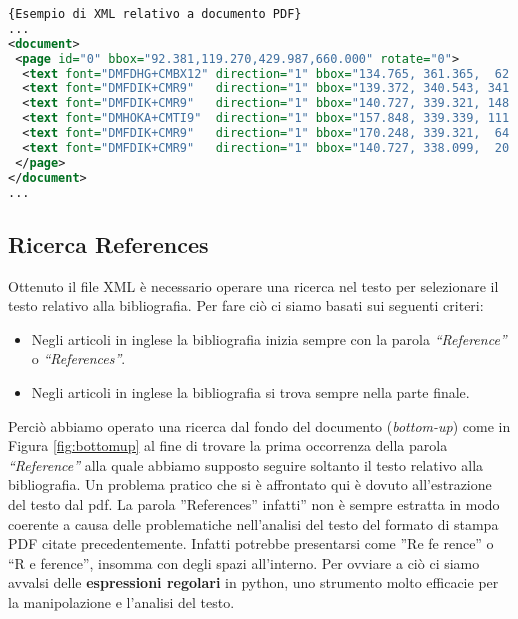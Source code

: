 \begin{lstlisting}[language=XML,frame=r,caption=Esempio di XML relativo a documento PDF ,breaklines=true,basicstyle=\small]{Esempio di XML relativo a documento PDF}
...
<document>
 <page id="0" bbox="92.381,119.270,429.987,660.000" rotate="0">
  <text font="DMFDHG+CMBX12" direction="1" bbox="134.765, 361.365,  62.920, 11.955" size="11.955">References</text>
  <text font="DMFDIK+CMR9"   direction="1" bbox="139.372, 340.543, 341.146,  8.966" size="8.966">1. J.-F. Arias, C.P. Lai, S. Surya, R. Kasturi, and A.K. Chhabra. Interpretation of</text>
  <text font="DMFDIK+CMR9"   direction="1" bbox="140.727, 339.321, 148.241,  8.966" size="8.966">telephone system manhole drawings.</text>
  <text font="DMHOKA+CMTI9"  direction="1" bbox="157.848, 339.339, 111.177,  8.966" size="8.966">Pattern Recognition Letters</text>
  <text font="DMFDIK+CMR9"   direction="1" bbox="170.248, 339.321,  64.383,  8.966" size="8.966">, 16(1):355&#8211;359,</text>
  <text font="DMFDIK+CMR9"   direction="1" bbox="140.727, 338.099,  20.990,  8.966" size="8.966">1995.</text>
 </page>
</document>
...
\end{lstlisting}



\subsection{Ricerca References} \label{sec:ricercaref}

Ottenuto il file XML è necessario operare una ricerca nel testo per selezionare il testo relativo alla bibliografia.
Per fare ciò ci siamo basati sui seguenti criteri:
\begin{itemize}
 \item Negli articoli in inglese la bibliografia inizia sempre con la parola \textit{``Reference''} o \textit{``References''}.
 \item Negli articoli in inglese la bibliografia si trova sempre nella parte finale.
\end{itemize}

Perciò abbiamo operato una ricerca dal fondo del documento (\textit{bottom-up}) come in Figura \ref{fig:bottomup} al fine di trovare la prima occorrenza della parola \textit{``Reference''} alla quale abbiamo supposto seguire soltanto il testo relativo alla bibliografia. 
Un problema pratico che si è affrontato qui è dovuto all'estrazione del testo dal pdf. La parola ''References'' infatti'' non è sempre estratta in modo coerente a causa delle problematiche nell'analisi del testo del formato di stampa PDF citate precedentemente. Infatti potrebbe presentarsi come ''Re fe rence'' o ``R e ference'', insomma con degli spazi all'interno. Per ovviare a ciò ci siamo avvalsi delle\textbf{ espressioni regolari} in python, uno strumento molto efficacie per la manipolazione e l'analisi del testo.

